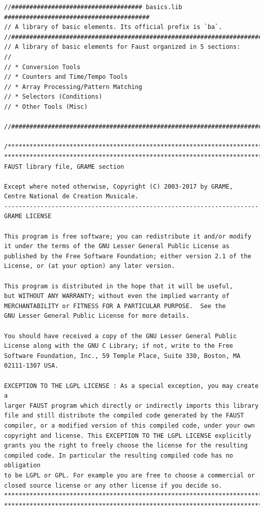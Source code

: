\documentclass{article}
\begin{document}
\bigskip\bigskip
\begin{lstlisting}[caption=\texttt{basics.lib}]
//#################################### basics.lib ########################################
// A library of basic elements. Its official prefix is `ba`.
//########################################################################################
// A library of basic elements for Faust organized in 5 sections:
//
// * Conversion Tools
// * Counters and Time/Tempo Tools
// * Array Processing/Pattern Matching
// * Selectors (Conditions)
// * Other Tools (Misc)

//########################################################################################

/************************************************************************
************************************************************************
FAUST library file, GRAME section

Except where noted otherwise, Copyright (C) 2003-2017 by GRAME,
Centre National de Creation Musicale.
----------------------------------------------------------------------
GRAME LICENSE

This program is free software; you can redistribute it and/or modify
it under the terms of the GNU Lesser General Public License as
published by the Free Software Foundation; either version 2.1 of the
License, or (at your option) any later version.

This program is distributed in the hope that it will be useful,
but WITHOUT ANY WARRANTY; without even the implied warranty of
MERCHANTABILITY or FITNESS FOR A PARTICULAR PURPOSE.  See the
GNU Lesser General Public License for more details.

You should have received a copy of the GNU Lesser General Public
License along with the GNU C Library; if not, write to the Free
Software Foundation, Inc., 59 Temple Place, Suite 330, Boston, MA
02111-1307 USA.

EXCEPTION TO THE LGPL LICENSE : As a special exception, you may create a
larger FAUST program which directly or indirectly imports this library
file and still distribute the compiled code generated by the FAUST
compiler, or a modified version of this compiled code, under your own
copyright and license. This EXCEPTION TO THE LGPL LICENSE explicitly
grants you the right to freely choose the license for the resulting
compiled code. In particular the resulting compiled code has no obligation
to be LGPL or GPL. For example you are free to choose a commercial or
closed source license or any other license if you decide so.
************************************************************************
************************************************************************/


\end{lstlisting}
\end{document}
